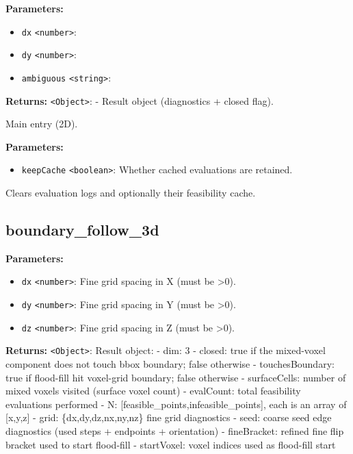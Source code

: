 \documentclass[12pt,a4paper]{article}
\begin{document}
\noindent \textbf{Parameters:}
\begin{itemize}
  \item \texttt{dx} \texttt{<number>}:
  \item \texttt{dy} \texttt{<number>}:
  \item \texttt{ambiguous} \texttt{<string>}:
\end{itemize}

\noindent \textbf{Returns:} \texttt{<Object>}: - Result object (diagnostics + closed flag).

\noindent Main entry (2D).

\vspace{5mm}
\noindent {}


\noindent \textbf{Parameters:}
\begin{itemize}
  \item \texttt{keepCache} \texttt{<boolean>}: Whether cached evaluations are retained.
\end{itemize}

\noindent Clears evaluation logs and optionally their feasibility cache.


\subsection{boundary\_follow\_3d}
\vspace{5mm}
\noindent {}


\noindent \textbf{Parameters:}
\begin{itemize}
  \item \texttt{dx} \texttt{<number>}: Fine grid spacing in X (must be >0).
  \item \texttt{dy} \texttt{<number>}: Fine grid spacing in Y (must be >0).
  \item \texttt{dz} \texttt{<number>}: Fine grid spacing in Z (must be >0).
\end{itemize}

\noindent \textbf{Returns:} \texttt{<Object>}: Result object:
- dim: 3
- closed: true if the mixed-voxel component does not touch bbox boundary; false otherwise
- touchesBoundary: true if flood-fill hit voxel-grid boundary; false otherwise
- surfaceCells: number of mixed voxels visited (surface voxel count)
- evalCount: total feasibility evaluations performed
- N: [feasible\_points,infeasible\_points], each is an array of [x,y,z]
- grid: \{dx,dy,dz,nx,ny,nz\} fine grid diagnostics
- seed: coarse seed edge diagnostics (used steps + endpoints + orientation)
- fineBracket: refined fine flip bracket used to start flood-fill
- startVoxel: voxel indices used as flood-fill start
\end{document}
